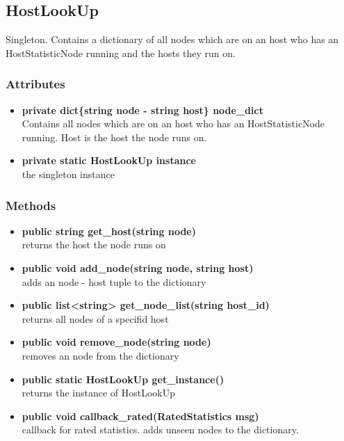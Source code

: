 \subsection{HostLookUp}
Singleton. Contains a dictionary of all nodes which are on an host who has an HostStatisticNode running and the hosts they run on.
\subsubsection{Attributes}
\begin{itemize}
	\item \textbf{ private dict\{string node - string host\} node\_dict }\\
		Contains all nodes which are on an host who has an HostStatisticNode running. Host is the host the node runs on.
	\item \textbf{ private static HostLookUp instance }\\
		the singleton instance
\end{itemize}
\subsubsection{Methods}
\begin{itemize}
	\item \textbf{ public string get\_host(string node) }\\
		returns the host the node runs on
	\item \textbf{ public void add\_node(string node, string host) }\\
		adds an node - host tuple to the dictionary
	\item \textbf{ public list<string> get\_node\_list(string host\_id) }\\
		returns all nodes of a specifid host
	\item \textbf{ public void remove\_node(string node) }\\
		removes an node from the dictionary
	\item \textbf{ public static HostLookUp get\_instance() }\\
		returns the instance of HostLookUp
	\item \textbf{ public void callback\_rated(RatedStatistics msg)}\\
		callback for rated statistics. adds unseen nodes to the dictionary.
\end{itemize}